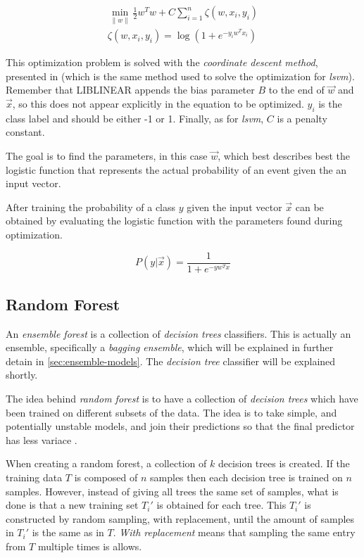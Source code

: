 \documentclass[epsfig,a4paper,11pt,titlepage,twoside,openany]{book}
\begin{document}
\begin{align*}
    \min_{\|w\|} \frac{1}{2} w^T w + C \sum_{i=1}^n \zeta(w, x_i, y_i) \\ 
    \zeta(w, x_i, y_i) = \log(1+ e^{-y_i w^T x_i})
\end{align*}

This optimization problem is solved with the \textit{coordinate descent method}, presented in \cite{Hsieh:2008_lsvm_coordinated_descent} (which is the same method used to solve the optimization for \textit{lsvm}). Remember that LIBLINEAR appends the bias parameter $B$ to the end of $\vec{w}$ and $\vec{x}$, so this does not appear explicitly in the equation to be optimized. $y_i$ is the class label and should be either -1 or 1. Finally, as for \textit{lsvm}, $C$ is a penalty constant.

The goal is to find the parameters, in this case $\vec{w}$, which best describes best the logistic function that represents the actual probability of an event given the an input vector.  

After training the probability \cite{Fan:2008_liblinear} of a class $y$ given the input vector $\vec{x}$ can be obtained by evaluating the logistic function with the parameters found during optimization.

\begin{equation}
    P(y | \vec{x}) = \frac{1}{1+ e^{-y w^T x}}
\end{equation}



\subsection{Random Forest}
\label{sec:clf-rfc}

An \textit{ensemble forest} \cite{breiman2001random_forest} is a collection of \textit{decision trees} classifiers. This is actually an ensemble, specifically a \textit{bagging ensemble}, which will be explained in further detain in \autoref{sec:ensemble-models}. The \textit{decision tree} classifier will be explained shortly.

The idea behind \textit{random forest} is to have a collection of \textit{decision trees} which have been trained on different subsets of the data. The idea is to take simple, and potentially unstable models, and join their predictions so that the final predictor has less variace \cite{breiman1996_perturbing}.

When creating a random forest, a collection of $k$ decision trees is created. If the training data $T$ is composed of $n$ samples then each decision tree is trained on $n$ samples. However, instead of giving all trees the same set of samples, what is done is that a new training set $T_i'$ is obtained for each tree. This $T_i'$ is constructed by random sampling, with replacement, until the amount of samples in $T_i'$ is the same as in $T$. \textit{With replacement} means that sampling the same entry from $T$ multiple times is allows. 
\end{document}

